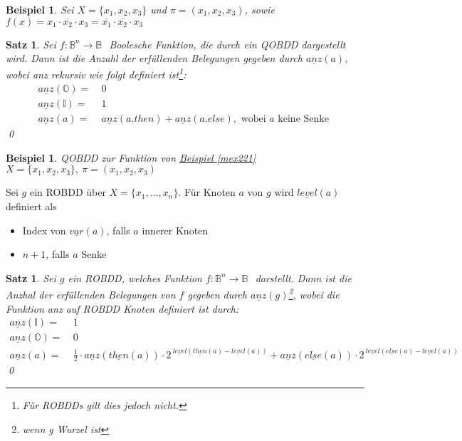 \documentclass[ngerman]{scrartcl}
\theoremstyle{custom}
\newtheorem{mex}[mdef]{Beispiel}
\newtheorem{ms}[mdef]{Satz}
\newcommand{\0}{\mathbf{0}}
\newcommand{\1}{\mathbf{L}}
\newcommand{\bol}{\mathds{B}^n \rightarrow \mathds{B}}
\newcommand{\bolf}{$f: \bol~$}
\begin{document}
\begin{mex}
  Sei $X = \{x_1,x_2,x_3\}$ und $\pi = (x_1,x_2,x_3)$, sowie $f(x) =
  x_1 \cdot \overline{x_2} \cdot x_3 = \overline{x_1} \cdot
  \overline{x_2} \cdot x_3$
\end{mex}

\begin{ms}
  Sei \bolf ~Boolesche Funktion, die durch ein QOBDD dargestellt
  wird. Dann ist die Anzahl der erf\"ullenden Belegungen gegeben durch
  $\underline{anz}(a)$, wobei anz rekursiv wie folgt definiert
  ist\footnote{F\"ur ROBDDs gilt dies jedoch nicht.}:
  \begin{align*}
    \underline{anz}(\mathds{O}) = & ~0\\
    \underline{anz}(\mathds{I}) = & ~1\\
    \underline{anz}(a) = & ~\underline{anz}(a.then) +
    \underline{anz}(a.else), \text{ wobei } a \text{ keine Senke }
  \end{align*}
\qed
\end{ms}

\begin{mex}
QOBDD zur Funktion von \hyperref[mex221]{Beispiel \ref{mex221}}\\
$X = \{x_1,x_2,x_3\}, ~\pi = (x_1,x_2,x_3)$
\end{mex}

Sei $g$ ein ROBDD \"uber $X = \{x_1, \dots, x_n\}$. F\"ur Knoten $a$
von $g$ wird $\underline{level}(a)$ definiert als 
\begin{itemize}
\item Index von $\underline{var}(a)$, falls $a$ innerer Knoten
\item $n+1$, falls $a$ Senke
\end{itemize}

\begin{ms}
  Sei $g$ ein ROBDD, welches Funktion \bolf ~darstellt. Dann ist die
  Anzhal der erf\"ullenden Belegungen von $f$ gegeben durch
  $\underline{anz}(g)$\footnote{wenn g Wurzel ist}, wobei die Funktion
  anz auf ROBDD Knoten definiert ist durch:
  \begin{align*}
    \underline{anz}(\mathds{I})=& ~1\\
    \underline{anz}(\mathds{O})=& ~0\\
    \underline{anz}(a) =& ~\frac{1}{2} \cdot
  \underline{anz}(\underline{then}(a)) \cdot
  2^{~\underline{level}(\underline{then}(a) - \underline{level}(a))} +
  \underline{anz}(\underline{else}(a)) \cdot
  2^{~\underline{level}(\underline{else}(a) - \underline{level}(a))}
  \end{align*}
\qed
\end{ms}
\end{document}
